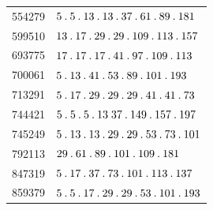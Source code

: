 \begin{longtable}{@{}r|l@{}}
554279 & $5\pdot 5\pdot 13\pdot 13\pdot 37\pdot 61\pdot 89\pdot 181$\\
599510 & $13\pdot 17\pdot 29\pdot 29\pdot 109\pdot 113\pdot 157$\\
693775 & $17\pdot 17\pdot 17\pdot 41\pdot 97\pdot 109\pdot 113$\\
700061 & $5\pdot 13\pdot 41\pdot 53\pdot 89\pdot 101\pdot 193$\\
713291 & $5\pdot 17\pdot 29\pdot 29\pdot 29\pdot 41\pdot 41\pdot 73$\\
744421 & $5\pdot 5\pdot 5\pdot 13\;37\pdot 149\pdot 157\pdot 197$\\
745249 & $5\pdot 13\pdot 13\pdot 29\pdot 29\pdot 53\pdot 73\pdot 101$\\
792113 & $29\pdot 61\pdot 89\pdot 101\pdot 109\pdot 181$\\
847319 & $5\pdot 17\pdot 37\pdot 73\pdot 101\pdot 113\pdot 137$\\
859379 & $5\pdot 5\pdot 17\pdot 29\pdot 29\pdot 53\pdot 101\pdot 193$\\
\end{longtable}\endgroup
